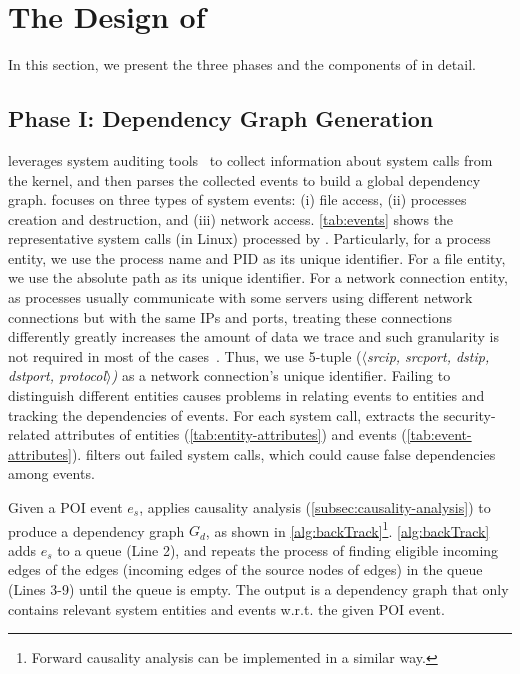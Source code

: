 \section{The Design of \tool}
\label{sec:approach}

In this section, we present the three phases and the components of \tool in detail.


\subsection{Phase I: Dependency Graph Generation}
\label{subsec:graph-generation}

\tool leverages system auditing tools~\cite{auditd,etw,dtrace,sysdig} to collect information about system calls from the kernel, and then parses the collected events to build a global dependency graph.
\tool focuses on three types of system events: 
(i) file access, 
(ii) processes creation and destruction, and
(iii) network access.
\cref{tab:events} shows the representative system calls (in Linux) processed by \tool.
Particularly, for a process entity, we use the process name and PID as its unique identifier.
For a file entity, we use the absolute path as its unique identifier. 
For a network 
connection entity, as processes usually communicate with some servers using different network connections but with the same IPs and ports, treating these connections differently greatly increases the amount of data we trace and such granularity is not required in most of the cases~\cite{liu2018priotracker,gao2018aiql,gao2018saql}. Thus, we use 5-tuple (\emph{$\langle$srcip, srcport, dstip, dstport, protocol$\rangle$)} as a network 
connection's
unique identifier. 
Failing to distinguish different entities causes problems in relating events to entities and tracking
the dependencies of events.
For each system call, \tool extracts 
the security-related attributes of entities (\cref{tab:entity-attributes}) and events (\cref{tab:event-attributes}).
\tool filters out failed system calls, which could cause false dependencies among events.


Given a POI event $e_s$, \tool applies causality analysis (\cref{subsec:causality-analysis}) to produce a dependency graph $G_d$, as shown in \cref{alg:backTrack}\footnote{Forward causality analysis can be implemented in a similar way.}.
\cref{alg:backTrack} adds $e_s$ to a queue (Line 2), and repeats the process of finding eligible incoming edges of the edges (\ie incoming edges of the source nodes of edges) in the queue (Lines 3-9) until the queue is empty. The output is a dependency graph that only contains relevant system entities and events w.r.t. the given POI event.

